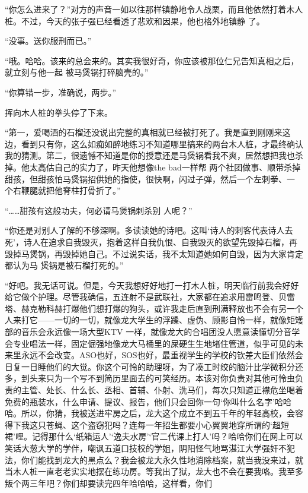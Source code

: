 \documentclass{article}
\begin{document}
\newpage

“你怎么进来了？”对方的声音一如以往那样镇静地令人战栗，而且他依然打着木人桩。不过，今天的张子强已经看透了悲欢和因果，他也格外地镇静
了。 


“没事。送你服刑而已。” 

“哦。哈哈。该来的总会来的。其实我很好奇，你应该被那位仁兄告知真相之后，就立刻与他一起
被马煲锅打碎脑壳的。” 


“你算错一步，准确说，两步。” 


挥向木人桩的拳头停了下来。 

“第一，爱喝酒的石榴还没说出完整的真相就已经被打死了。我是直到刚刚来这边，看到只有你，这么如痴如醉地练习不知道哪里搞来的两台木人桩，才最终确认我的猜测。第二，很遗憾不知道是你的授意还是马煲锅看我不爽，居然想把我也杀掉。他太高估自己的实力了，昨天他想像the bad一样帮
\newpage
两个社团做事、顺带杀掉甜孩，但甜孩怕马煲锅招供她的指使，很快啊，闪过子弹，然后一个左刺拳、一
个右鞭腿就把他脊柱打骨折了。” 

“……甜孩有这般功夫，何必请马煲锅刺杀别
人呢？” 

“你还是对别人了解的不够深啊。多读读她的诗吧。这叫‘诗人的刺客代表诗人去死’，诗人在追求自我毁灭，抱着这样自我仇恨、自我毁灭的欲望先毁掉石榴，再毁掉马煲锅，再毁掉她自己。不过说实话，我不太知道她如何自毁，因为大家肯定都认为马
煲锅是被石榴打死的。” 

“好吧。我无话可说。但是，今天我想好好地打一打木人桩，明天临行前我会好好给它做个护理。尽管我确信，五连射不是武联社，大家都在追求用雷鸣登、贝雷塔、赫克勒科赫打爆他们想打爆的狗头，或许我走后直到刑满释放也不会有另一个人来打它——一切的一切，就像龙大学生的浮躁、虚伪、顾影自怜一样，就像矩矱部的音乐会永远像一场大型KTV
\newpage
一样，就像龙大的合唱团没人愿意读懂切分音学会专业唱法一样，固定倔强地像龙大马桶里的屎硬生生地堵住管道，似乎可见的未来里永远不会改变。ASO也好，SOS也好，最重视学生的学校的钦差大臣们依然会日复一日睡他们的大觉。你这个可怜的助理呀，为了凑工时绞的脑汁比学微积分还多，到头来只为一个写不到简历里面去的可笑经历。本该对你负责对其他可怜虫负责的主管、处长、什么长、丞相、首辅、仆射、洗马们，每次只知道正襟危坐喝着免费的瓶装水，什么申请、提议、报告，他们只会回你一句‘你叫什么名字’哈哈哈。所以，你猜，我被送进牢房之后，龙大这个成立不到五千年的年轻高校，会容得下我这只苍蝇、这个盗窃犯吗？连每一年招生都要小心翼翼地穿所谓的‘超短裙’哩。记得那什么‘纸箱运人’‘逸夫水房’‘官二代课上打人’吗？哈哈你们在网上可以笑话大葱大学的学伴，嘲讽五道口技校的学姐，阴阳怪气地骂湛江大学强奸不犯法，你们能找到龙大的黑点么？我会被龙大永久性地消除档案，就当我没来过，就当木人桩一直老老实实地摆在练功房。等我出了狱，龙大也不会在要我咯。我至多叛个两三年吧？你们却要读完四年哈哈哈，这样看，你们
\newpage
\end{document}

